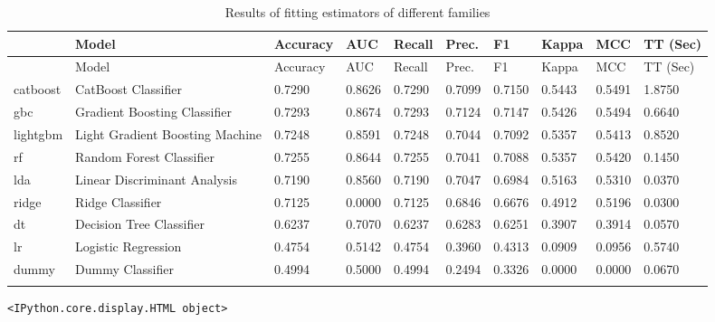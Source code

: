 \documentclass[
  letterpaper,
  DIV=11,
  numbers=noendperiod]{scrartcl}
\begin{document}
\hypertarget{tbl-leaderboard}{}
\begin{longtable}[]{@{}llllllllll@{}}
\toprule\noalign{}
~ & Model & Accuracy & AUC & Recall & Prec. & F1 & Kappa & MCC & TT
(Sec) \\
\midrule\noalign{}
\endfirsthead
\toprule\noalign{}
~ & Model & Accuracy & AUC & Recall & Prec. & F1 & Kappa & MCC & TT
(Sec) \\
\midrule\noalign{}
\endhead
\bottomrule\noalign{}
\endlastfoot
catboost & CatBoost Classifier & 0.7290 & 0.8626 & 0.7290 & 0.7099 &
0.7150 & 0.5443 & 0.5491 & 1.8750 \\
gbc & Gradient Boosting Classifier & 0.7293 & 0.8674 & 0.7293 & 0.7124 &
0.7147 & 0.5426 & 0.5494 & 0.6640 \\
lightgbm & Light Gradient Boosting Machine & 0.7248 & 0.8591 & 0.7248 &
0.7044 & 0.7092 & 0.5357 & 0.5413 & 0.8520 \\
rf & Random Forest Classifier & 0.7255 & 0.8644 & 0.7255 & 0.7041 &
0.7088 & 0.5357 & 0.5420 & 0.1450 \\
lda & Linear Discriminant Analysis & 0.7190 & 0.8560 & 0.7190 & 0.7047 &
0.6984 & 0.5163 & 0.5310 & 0.0370 \\
ridge & Ridge Classifier & 0.7125 & 0.0000 & 0.7125 & 0.6846 & 0.6676 &
0.4912 & 0.5196 & 0.0300 \\
dt & Decision Tree Classifier & 0.6237 & 0.7070 & 0.6237 & 0.6283 &
0.6251 & 0.3907 & 0.3914 & 0.0570 \\
lr & Logistic Regression & 0.4754 & 0.5142 & 0.4754 & 0.3960 & 0.4313 &
0.0909 & 0.0956 & 0.5740 \\
dummy & Dummy Classifier & 0.4994 & 0.5000 & 0.4994 & 0.2494 & 0.3326 &
0.0000 & 0.0000 & 0.0670 \\
\caption{\label{tbl-leaderboard}Results of fitting estimators of
different families}\label{T_967cf}\tabularnewline
\end{longtable}

\begin{verbatim}
<IPython.core.display.HTML object>
\end{verbatim}
\end{document}
